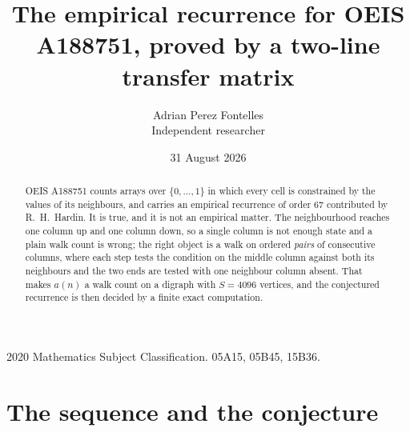 \documentclass[11pt,a4paper]{article}
\title{The empirical recurrence for OEIS A188751, proved by a two-line transfer matrix}
\author{Adrian Perez Fontelles\\ \small Independent researcher}
\date{31 August 2026}
\theoremstyle{plain}
\theoremstyle{definition}
\begin{document}
\maketitle

\begin{abstract}
OEIS A188751 counts arrays over $\{0,\dots,1\}$ in which every cell is constrained by the
values of its neighbours, and carries an empirical recurrence of order $67$ contributed
by R.~H.~Hardin. It is true, and it is not an empirical matter. The neighbourhood reaches one
column up and one column down, so a single column is not enough state and a plain walk count
is wrong; the right object is a walk on ordered \emph{pairs} of consecutive columns, where
each step tests the condition on the middle column against both its neighbours and the two
ends are tested with one neighbour column absent. That makes $a(n)$ a walk count on a digraph
with $S=4096$ vertices, and the conjectured recurrence is then decided by a finite exact
computation.
\end{abstract}

\noindent\small 2020 Mathematics Subject Classification. 05A15, 05B45, 15B36.\normalsize

\section{The sequence and the conjecture}
\end{document}
